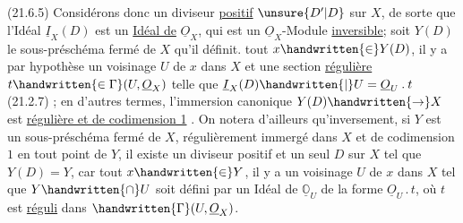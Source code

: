 (21.6.5) Considérons donc un diviseur \uline{positif} $\unsure{D'|D}$ sur $X$, de sorte que l'Idéal  $\underline I_{X}(D)$ est un \uline{Idéal de} $\underline O_{X}$, qui est un $\underline O_{X}$-Module \uline{inversible}; soit $Y(D)$ le sous-préschéma fermé de $X$ qu'il définit.   tout $x\handwritten{\in}Y(D)$,  il y a par hypothèse un voisinage  $U$ de $x$ dans $X$ et une section \uline{régulière} $t\handwritten{\in\Gamma}(U,\underline O_{X})$ telle que $\underline I_{X}(D)\handwritten{\mid}U=\underline O_{U}\mathbin{.}t$ (21.2.7) ; en d'autres termes, l'immersion canonique $Y(D)\handwritten{\to}X$ est \uline{régulière et de codimension 1} . On notera d'ailleurs qu'inversement, si $Y$ \reversemarginpar
est un sous-préschéma fermé de $X$, régulièrement immergé dans $X$ et  de codimension $1$ en tout point de $Y$, il existe un diviseur positif et un seul  $D$ sur $X$ tel que $Y(D)=Y$, car  tout $x\handwritten{\in}Y$, il y a un voisinage $U$ de $x$ dans $X$ tel que $Y\handwritten{\cap}U$ soit défini par un Idéal de $\underline{\mathbb O}_{U}$ de la forme $\underline O_{U}\mathbin{.}t$, où $t$ est \uline{réguli} dans $\handwritten{\Gamma}(U,\underline O_{X})$.


